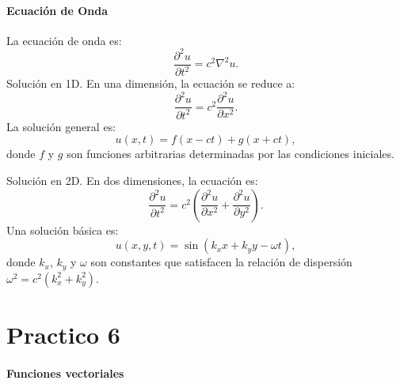 \documentclass[11pt]{book}
\theoremstyle{definicion}
\theoremstyle{teorema}
\theoremstyle{ejemplo}
\begin{document}
\paragraph{Ecuación de Onda}
La ecuación de onda es:
\[
\frac{\partial^2 u}{\partial t^2} = c^2 \nabla^2 u.
\]
Solución en 1D.
En una dimensión, la ecuación se reduce a:
\[
\frac{\partial^2 u}{\partial t^2} = c^2 \frac{\partial^2 u}{\partial x^2}.
\]
La solución general es:
\[
u(x, t) = f(x - ct) + g(x + ct),
\]
donde \(f\) y \(g\) son funciones arbitrarias determinadas por las condiciones iniciales.

\medskip

\noindent Solución en 2D.
En dos dimensiones, la ecuación es:
\[
\frac{\partial^2 u}{\partial t^2} = c^2 \left( \frac{\partial^2 u}{\partial x^2} + \frac{\partial^2 u}{\partial y^2} \right).
\]
Una solución básica es:
\[
u(x, y, t) = \sin(k_x x + k_y y - \omega t),
\]
donde \(k_x\), \(k_y\) y \(\omega\) son constantes que satisfacen la relación de dispersión \(\omega^2 = c^2 (k_x^2 + k_y^2)\).

\newpage

\section{Practico 6}

\paragraph{Funciones vectoriales}
\end{document}
